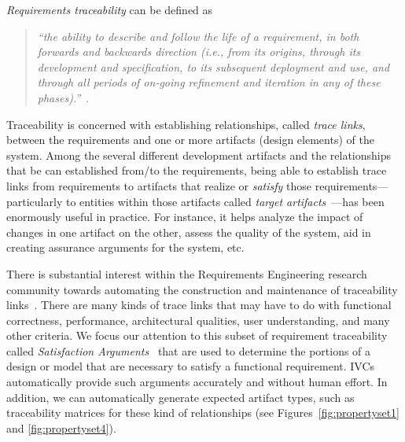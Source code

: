 \emph{Requirements traceability} can be defined as \\
\begin{quotation}
\textit{``the ability to describe and follow the life of a requirement, in both forwards and backwards direction (i.e., from its origins, through its development and specification, to its subsequent deployment and use, and through all periods of on-going refinement and iteration in any of these phases).''}~\cite{gotel}. \\
\end{quotation}


Traceability is concerned with establishing relationships, called \emph{trace links}, between the requirements and one or more artifacts (design elements) of the system.
Among the several different development artifacts and the relationships that be can established from/to the requirements, being able to establish trace links from requirements to artifacts that realize or \emph{satisfy} those requirements---particularly to entities within those artifacts called \emph{target artifacts}~\cite{gotel2012traceability}---has been enormously useful in practice.
For instance, it helps analyze the impact of changes in one artifact on the other, assess the quality of the system, aid in creating assurance arguments for the system, etc.

There is substantial interest within the Requirements Engineering research community towards automating the construction and maintenance of traceability links~\cite{hayes2003improving, egyed2002automating,cleland2007best}.
There are many kinds of trace links that may have to do with functional correctness, performance, architectural qualities, user understanding, and many other criteria.
%
%
We focus our attention to this subset of requirement traceability called {\em Satisfaction Arguments}~\cite{Hammond01:WiW} that are used to determine the portions of a design or model that are necessary to satisfy a functional requirement.  IVCs automatically provide such arguments accurately and without human effort.  In addition, we can automatically generate expected artifact types, such as traceability matrices for these kind of relationships (see Figures~\ref{fig:propertyset1} and \ref{fig:propertyset4}).  

